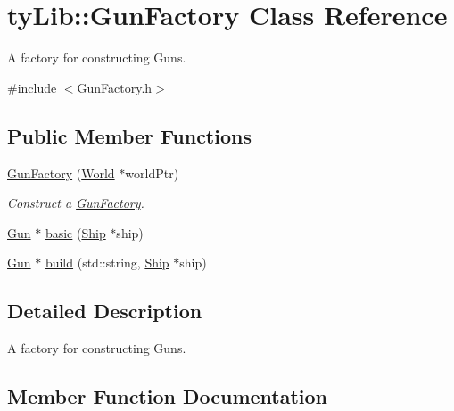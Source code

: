\hypertarget{classty_lib_1_1_gun_factory}{}\section{ty\+Lib\+:\+:Gun\+Factory Class Reference}
\label{classty_lib_1_1_gun_factory}


A factory for constructing Guns.  




{\ttfamily \#include $<$Gun\+Factory.\+h$>$}

\subsection*{Public Member Functions}
\begin{DoxyCompactItemize}
\item 
\hypertarget{classty_lib_1_1_gun_factory_ae3c4ba49d152f1463a1548b9bd14a926}{}\hyperlink{classty_lib_1_1_gun_factory_ae3c4ba49d152f1463a1548b9bd14a926}{Gun\+Factory} (\hyperlink{classty_lib_1_1_world}{World} $\ast$world\+Ptr)\label{classty_lib_1_1_gun_factory_ae3c4ba49d152f1463a1548b9bd14a926}

\begin{DoxyCompactList}\small\item\em Construct a \hyperlink{classty_lib_1_1_gun_factory}{Gun\+Factory}. \end{DoxyCompactList}\item 
\hyperlink{classty_lib_1_1_gun}{Gun} $\ast$ \hyperlink{classty_lib_1_1_gun_factory_adb3c0dc98bef5221c9e8f706f7fb8904}{basic} (\hyperlink{classty_lib_1_1_ship}{Ship} $\ast$ship)
\item 
\hyperlink{classty_lib_1_1_gun}{Gun} $\ast$ \hyperlink{classty_lib_1_1_gun_factory_af701b5fd3a248319ed0c1f8b1791860d}{build} (std\+::string, \hyperlink{classty_lib_1_1_ship}{Ship} $\ast$ship)
\end{DoxyCompactItemize}


\subsection{Detailed Description}
A factory for constructing Guns. 

\subsection{Member Function Documentation}
\hypertarget{classty_lib_1_1_gun_factory_adb3c0dc98bef5221c9e8f706f7fb8904}{}
